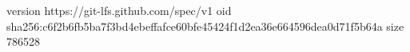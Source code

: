 version https://git-lfs.github.com/spec/v1
oid sha256:c6f2b6fb5ba7f3bd4ebeffafce60bfe45424f1d2ea36e664596dea0d71f5b64a
size 786528

